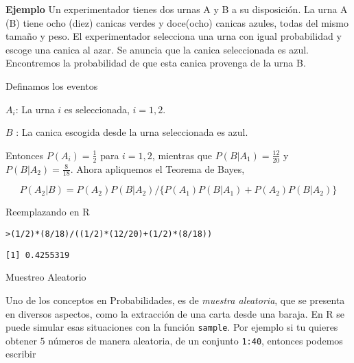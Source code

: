 \documentclass{article}\usepackage[]{graphicx}\usepackage[]{color}
\makeatletter
\newcommand{\hlnum}[1]{\textcolor[rgb]{0.686,0.059,0.569}{#1}}%
\newcommand{\hlopt}[1]{\textcolor[rgb]{0,0,0}{#1}}%
\newcommand{\hlstd}[1]{\textcolor[rgb]{0.345,0.345,0.345}{#1}}%
\newenvironment{kframe}{%
 \def\at@end@of@kframe{}%
 \ifinner\ifhmode%
  \def\at@end@of@kframe{\end{minipage}}%
  \begin{minipage}{\columnwidth}%
 \fi\fi%
 \def\FrameCommand##1{\hskip\@totalleftmargin \hskip-\fboxsep
 \colorbox{shadecolor}{##1}\hskip-\fboxsep
     \hskip-\linewidth \hskip-\@totalleftmargin \hskip\columnwidth}%
 \MakeFramed {\advance\hsize-\width
   \@totalleftmargin\z@ \linewidth\hsize
   \@setminipage}}%
 {\par\unskip\endMakeFramed%
 \at@end@of@kframe}
\newenvironment{knitrout}{}{} %
\makeatother
\begin{document}
\vspace{0.3cm}

\textbf{Ejemplo} Un experimentador tienes dos urnas A y B a su disposici\'on. La urna A (B) tiene ocho (diez) canicas verdes y doce(ocho) canicas azules, todas del mismo tama\~no y peso. El experimentador selecciona una urna con igual probabilidad y escoge una canica al azar. Se anuncia  que la canica seleccionada es azul. Encontremos la probabilidad de que esta canica provenga de la urna B.

\vspace{0.3cm}

Definamos los eventos

\vspace{0.2cm}

$A_i$: La urna $i $ es seleccionada, $i = 1,2$.

$B$ : La canica escogida desde la urna seleccionada es azul.

Entonces $P(A_i) = \frac{1}{2}$ para $i = 1, 2$, mientras que $P(B|A_1) = \frac{12}{20}$ y $P(B|A_2) = \frac{8}{18}$. Ahora apliquemos el Teorema de Bayes,

\[
P(A_2|B) = P(A_2)P(B|A_2) /\{ P(A_1)P(B|A_1) + P(A_2)P(B|A_2) \} 
\]


Reemplazando en R

\begin{knitrout}
\color{fgcolor}\begin{kframe}
\begin{alltt}
\hlstd{> }\hlstd{(}\hlnum{1}\hlopt{/}\hlnum{2}\hlstd{)}\hlopt{*}\hlstd{(}\hlnum{8}\hlopt{/}\hlnum{18}\hlstd{)}\hlopt{/}\hlstd{((}\hlnum{1}\hlopt{/}\hlnum{2}\hlstd{)}\hlopt{*}\hlstd{(}\hlnum{12}\hlopt{/}\hlnum{20}\hlstd{)} \hlopt{+} \hlstd{(}\hlnum{1}\hlopt{/}\hlnum{2}\hlstd{)}\hlopt{*}\hlstd{(}\hlnum{8}\hlopt{/}\hlnum{18}\hlstd{))}
\end{alltt}
\begin{verbatim}
[1] 0.4255319
\end{verbatim}
\end{kframe}
\end{knitrout}
\vspace{0.8cm}

{\large Muestreo Aleatorio}



\vspace{0.3cm}

Uno de los conceptos en Probabilidades, es de  \textit{muestra aleatoria}, que se presenta en diversos aspectos, como la extracci\'on de una carta desde una baraja. En R se puede simular esas situaciones con la funci\'on \texttt{sample}. Por ejemplo si tu quieres obtener $5$ n\'umeros de manera aleatoria, de un conjunto \texttt{1:40}, entonces podemos escribir
\end{document}
